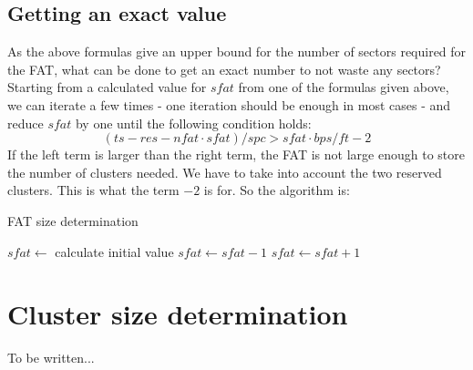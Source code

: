 \documentclass[12pt]{scrartcl}
\begin{document}
\subsection{Getting an exact value}
As the above formulas give an upper bound for the number of sectors required for the FAT, what can be done to get an exact number to not waste any sectors? Starting from a calculated value for $sfat$ from one of the formulas given above, we can iterate a few times - one iteration should be enough in most cases - and reduce $sfat$ by one until the following condition holds:
\begin{equation}
(ts - res - nfat \cdot sfat) / spc > sfat \cdot bps / ft - 2
\end{equation}
If the left term is larger than the right term, the FAT is not large enough to store the number of clusters needed. We have to take into account the two reserved clusters. This is what the term $-2$ is for. So the algorithm is:
\begin{algorithm}
\begin{algorithmic}
\caption{FAT size determination}
\State $sfat \gets$ calculate initial value
\State $sfat \gets sfat - 1$
\EndWhile
\State $sfat \gets sfat + 1$
\end{algorithmic}
\end{algorithm}

\section{Cluster size determination}
To be written...
\end{document}
